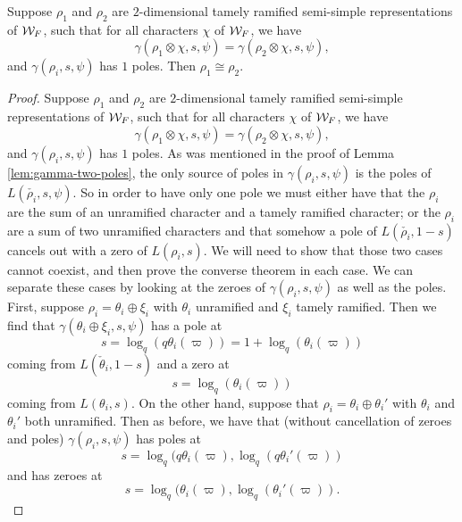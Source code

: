 \begin{lemma}
  \label{lem:gamma-one-pole}
  Suppose $\rho_1$ and $\rho_2$ are $2$-dimensional tamely ramified semi-simple representations of $\mathcal{W}_F$, such that for all characters $\chi$ of $\mathcal{W}_F$, we have
  \[\gamma(\rho_1 \otimes \chi,s,\psi) = \gamma(\rho_2 \otimes \chi,s,\psi),\]
  and $\gamma(\rho_i,s,\psi)$ has $1$ poles.
  Then $\rho_1 \cong \rho_2$.
\end{lemma}

\begin{proof}
  Suppose $\rho_1$ and $\rho_2$ are $2$-dimensional tamely ramified semi-simple representations of $\mathcal{W}_F$, such that for all characters $\chi$ of $\mathcal{W}_F$, we have
  \[\gamma(\rho_1 \otimes \chi,s,\psi) = \gamma(\rho_2 \otimes \chi,s,\psi),\]
  and $\gamma(\rho_i,s,\psi)$ has $1$ poles.
  As was mentioned in the proof of Lemma \ref{lem:gamma-two-poles}, the only source of poles in $\gamma(\rho_i,s,\psi)$ is the poles of $L(\check{\rho_i},s,\psi)$.
  So in order to have only one pole we must either have that the $\rho_i$ are the sum of an unramified character and a tamely ramified character; or the $\rho_i$ are a sum of two unramified characters and that somehow a pole of $L(\check{\rho_i},1-s)$ cancels out with a zero of $L(\rho_i,s)$.
  We will need to show that those two cases cannot coexist, and then prove the converse theorem in each case.
  We can separate these cases by looking at the zeroes of $\gamma(\rho_i,s ,\psi)$ as well as the poles.
  First, suppose $\rho_i = \theta_i \oplus \xi_i$ with $\theta_i$ unramified and $\xi_i$ tamely ramified.
  Then we find that $\gamma(\theta_i \oplus \xi_i,s,\psi)$ has a pole at
  \[s = \log_q(q\theta_i(\varpi)) = 1 + \log_q(\theta_i(\varpi))\]
  coming from $L(\check{\theta}_i,1-s)$ and a zero at
  \[s = \log_q(\theta_i(\varpi))\]
  coming from $L(\theta_i,s)$.
  On the other hand, suppose that $\rho_i = \theta_i \oplus \theta_i'$ with $\theta_i$ and $\theta_i'$ both unramified. Then as before, we have that (without cancellation of zeroes and poles)  $\gamma(\rho_i,s,\psi)$ has poles at
  \[s = \log_q(q\theta_i(\varpi), \log_q(q\theta_i'(\varpi))\]
  and has zeroes at
  \[s = \log_q(\theta_i(\varpi), \log_q(\theta_i'(\varpi)).\]



\end{proof}
